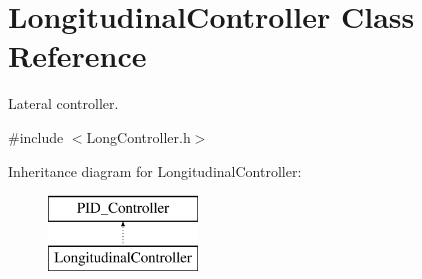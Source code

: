 \hypertarget{class_longitudinal_controller}{}\section{Longitudinal\+Controller Class Reference}
\label{class_longitudinal_controller}


Lateral controller.  




{\ttfamily \#include $<$Long\+Controller.\+h$>$}

Inheritance diagram for Longitudinal\+Controller\+:\begin{figure}[H]
\begin{center}
\leavevmode
\includegraphics[height=2.000000cm]{class_longitudinal_controller}
\end{center}
\end{figure}
